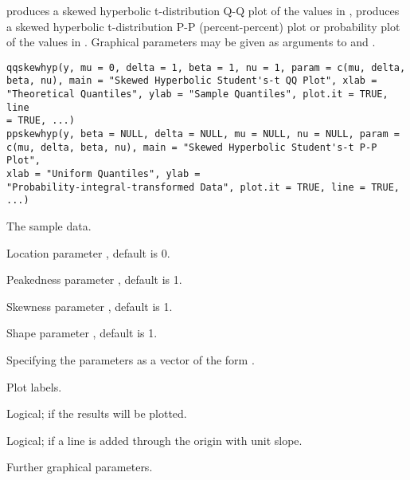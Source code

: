 \documentclass{book}
\begin{document}
\begin{Description}\relax
{} produces a skewed hyperbolic t-distribution Q-Q plot
of the values in ,  produces a skewed
hyperbolic t-distribution P-P (percent-percent) plot or probability
plot of the values in .
Graphical parameters may be given as arguments to  and
.
\end{Description}
\begin{Usage}
\begin{verbatim}
qqskewhyp(y, mu = 0, delta = 1, beta = 1, nu = 1, param = c(mu, delta,
beta, nu), main = "Skewed Hyperbolic Student's-t QQ Plot", xlab =
"Theoretical Quantiles", ylab = "Sample Quantiles", plot.it = TRUE, line
= TRUE, ...)
ppskewhyp(y, beta = NULL, delta = NULL, mu = NULL, nu = NULL, param =
c(mu, delta, beta, nu), main = "Skewed Hyperbolic Student's-t P-P Plot",
xlab = "Uniform Quantiles", ylab =
"Probability-integral-transformed Data", plot.it = TRUE, line = TRUE, ...)

\end{verbatim}
\end{Usage}
\begin{Arguments}
\begin{ldescription}
\item[\code{y}] The sample data.
\item[\code{mu}] Location parameter , default is 0.
\item[\code{delta}] Peakedness parameter , default is 1.
\item[\code{beta}] Skewness parameter , default is 1.
\item[\code{nu}] Shape parameter , default is 1.
\item[\code{param}] Specifying the parameters as a vector of the form
.
\item[\code{main,xlab,ylab}] Plot labels.
\item[\code{plot.it}] Logical; if  the results will be plotted.
\item[\code{line}] Logical; if  a line is added through the
origin with unit slope.
\item[\code{...}] Further graphical parameters.
\end{ldescription}
\end{Arguments}
\end{document}
